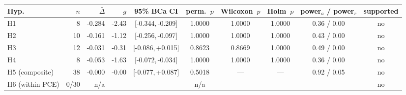 \begin{tabular}{l r r r c c c c c c}
\toprule
Hyp. & $n$ & $\bar\Delta$ & $g$ & 95\% BCa CI & perm.~$p$ & Wilcoxon~$p$ & Holm~$p$ & power$_a$ / power$_r$ & supported \\
\midrule
H1 & 8 & -0.284 & -2.43 & [-0.344,\,-0.209] & 1.0000 & 1.0000 & 1.0000 & 0.36 / 0.00 & no \\
H2 & 10 & -0.161 & -1.12 & [-0.256,\,-0.097] & 1.0000 & 1.0000 & 1.0000 & 0.43 / 0.00 & no \\
H3 & 12 & -0.031 & -0.31 & [-0.086,\,+0.015] & 0.8623 & 0.8669 & 1.0000 & 0.49 / 0.00 & no \\
H4 & 8 & -0.053 & -1.63 & [-0.072,\,-0.034] & 1.0000 & 1.0000 & 1.0000 & 0.36 / 0.00 & no \\
H5 (composite) & 38 & -0.000 & -0.00 & [-0.077,\,+0.087] & 0.5018 & --- & --- & 0.92 / 0.05 & no \\
H6 (within-PCE) & 0/30 & n/a & --- & --- & n/a & --- & --- & --- & no \\
\bottomrule
\end{tabular}
